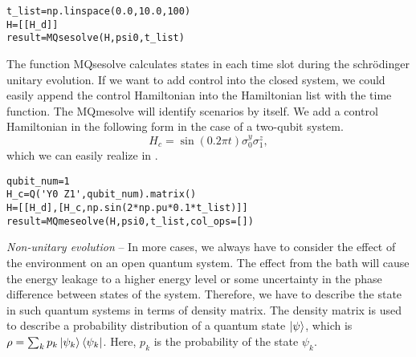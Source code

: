\begin{lstlisting}
t_list=np.linspace(0.0,10.0,100)
H=[[H_d]]
result=MQsesolve(H,psi0,t_list)
\end{lstlisting}
The function MQsesolve calculates states in each time slot during the schrödinger unitary evolution. If we want to add control into the closed system, we could easily append the control Hamiltonian into the Hamiltonian list with the time function. The MQmesolve will identify scenarios by itself. We add a control Hamiltonian in the following form in the case of a two-qubit system.
\begin{equation}
    H_{c}=\sin(0.2\pi t)\sigma_{0}^{y}\sigma_{1}^{z},
\end{equation}
which we can easily realize in \MindQuantum.
\begin{lstlisting}
qubit_num=1
H_c=Q('Y0 Z1',qubit_num).matrix()
H=[[H_d],[H_c,np.sin(2*np.pu*0.1*t_list)]]
result=MQmeseolve(H,psi0,t_list,col_ops=[])
\end{lstlisting}
\textit{Non-unitary evolution} -- In more cases, we always have to consider the effect of the environment on an open quantum system. The effect from the bath will cause the energy leakage to a higher energy level or some uncertainty in the phase difference between states of the system. Therefore, we have to describe the state in such quantum systems in terms of density matrix. The density matrix is used to describe a probability distribution of a quantum state $\ket{\psi}$, which is $\rho=\sum_{k}p_{k}\ket{\psi_{k}}\bra{\psi_{k}}$. Here, $p_k$ is the probability of the state $\psi_k$.

